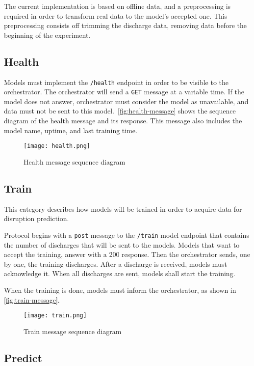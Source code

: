 The current implementation is based on offline data, and a preprocessing is required in order to transform real data to the model's accepted one. This preprocessing consists off trimming the discharge data, removing data before the beginning of the experiment.

\subsection{Health}

Models must implement the \texttt{/health} endpoint in order to be visible to the orchestrator. The orchestrator will send a \texttt{GET} message at a variable time. If the model does not answer, orchestrator must consider the model as unavailable, and data must not be sent to this model.\ \autoref{fig:health-message} shows the sequence diagram of the health message and its response. This message also includes the model name, uptime, and last training time.

\begin{figure}[H]
    \centering
    \texttt{[image: health.png]}
    \caption{Health message sequence diagram}
    \label{fig:health-message}
\end{figure}

\subsection{Train} 

This category describes how models will be trained in order to acquire data for disruption prediction. 

Protocol begins with a \texttt{post} message to the \texttt{/train} model endpoint that contains the number of discharges that will be sent to the models. Models that want to accept the training, answer with a 200 response. Then the orchestrator sends, one by one, the training discharges. After a discharge is received, models must acknowledge it. When all discharges are sent, models shall start the training.

When the training is done, models must inform the orchestrator, as shown in \autoref{fig:train-message}.

\begin{figure}[H]
    \centering
    \texttt{[image: train.png]}
    \caption{Train message sequence diagram}
    \label{fig:train-message}
\end{figure}

\subsection{Predict}

